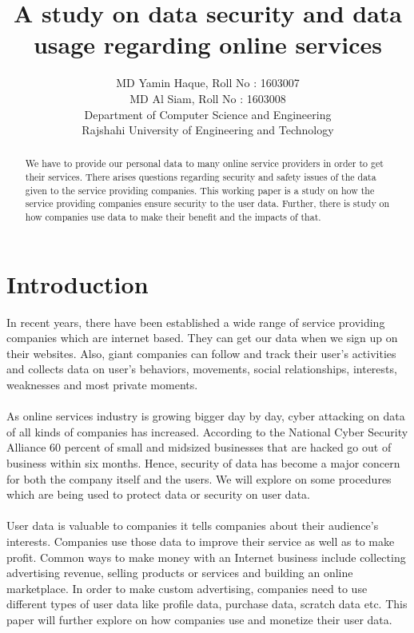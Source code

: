 \documentclass[12pt,a4paper,conference]{IEEEtran}
\title{{\color{blue}A study on data security and
data usage regarding online
services}}
\author{MD Yamin Haque, Roll No : 1603007\\
MD Al Siam, Roll No : 1603008\\
Department of Computer Science and Engineering\\
Rajshahi University of Engineering and Technology}
\begin{document}
\maketitle

\begin{abstract}

We have to provide our personal data to many online service providers in order to get their services. There arises questions regarding security and safety issues of the data given to the service providing companies. This working paper is a study on how the service providing companies ensure security to the user data. Further, there is study on how companies use data to make their benefit and the impacts of that.
\end{abstract}

\section{Introduction}
In recent years, there have been established a wide range of service providing companies which are internet based. They can get our data when we sign up on their websites. Also, giant companies can follow and track their user’s activities and collects data on user’s behaviors, movements, social relationships, interests, weaknesses and most private moments.\autocite{Wolfie17} 
\\
\\
As online services industry is growing bigger day by day, cyber attacking on data of all kinds of companies has increased. According to the National Cyber Security Alliance 60 percent of small and midsized businesses that are hacked go out of business within six months.\autocite{joe18} Hence, security of data has become a major concern for both the company itself and the users. We will explore on some procedures which are being used to protect data or security on user data.
\\
\\
User data is valuable to companies it tells companies about their audience’s interests. Companies use those data to improve their service as well as to make profit. Common ways to make money with an Internet business include collecting advertising revenue, selling products or services and building an online marketplace. In order to make custom advertising, companies need to use different types of user data like profile data, purchase data, scratch data etc.\autocite{CLINT} This paper will further explore on how companies use and monetize their user data.
\end{document}
